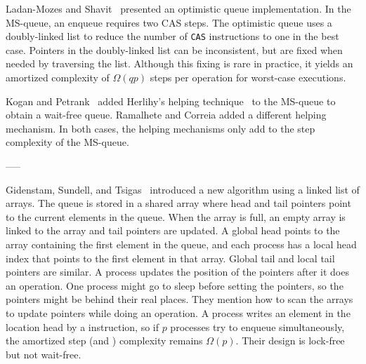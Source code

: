 Ladan-Mozes and Shavit~\cite{DBLP:journals/dc/Ladan-MozesS08}
presented an optimistic  queue implementation. 
In the MS-queue, an enqueue requires two CAS steps.
The optimistic queue uses a doubly-linked list to reduce the number of
\texttt{CAS} instructions to one in the best case. 
Pointers in the doubly-linked list can be inconsistent, but are fixed when needed by traversing the list.
Although this fixing is rare in practice, it yields an amortized complexity of $\Omega(qp)$ 
steps per operation for worst-case executions.

Kogan and Petrank~\cite{DBLP:conf/ppopp/KoganP11} 
added Herlihy's helping
technique~\cite{10.1145/114005.102808} to the MS-queue to obtain
a wait-free queue.
Ramalhete and Correia \cite{RC17} added a different helping mechanism.
In both cases, the helping mechanisms only add to the step complexity of the MS-queue.


-----


Gidenstam, Sundell, and Tsigas~\cite{DBLP:conf/opodis/GidenstamST10}
introduced a new algorithm using a linked list of arrays. The queue is
stored in a shared array where head and tail pointers point to the
current elements in the queue. When the array is full, an empty array
is linked to the array and tail pointers are updated. A global head
points to the array containing the first element in the queue, and
each process has a local head index that points to the first element
in that array. Global tail and local tail pointers are similar. A
process updates the position of the pointers after it does an
operation. One process might go to sleep before setting the pointers,
so the pointers might be behind their real places. They mention how to
scan the arrays to update pointers while doing an operation. A process
writes an element in the location head by a  instruction, so
if $p$ processes try to enqueue simultaneously, the amortized step
(and ) complexity remains $\Omega(p)$. Their design is
lock-free but not wait-free. 




